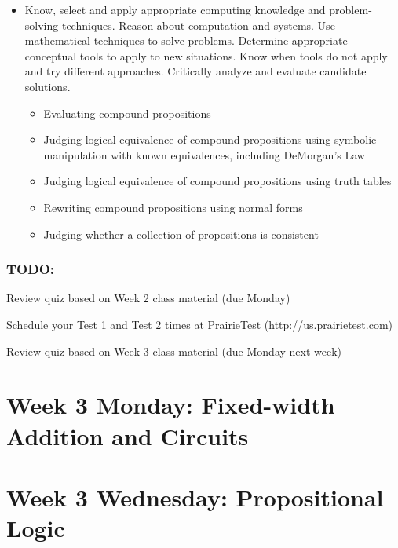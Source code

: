 \begin{itemize}
\item Know, select and apply appropriate computing knowledge and problem-solving techniques. Reason about computation and systems. Use mathematical techniques to solve problems. Determine appropriate conceptual tools to apply to new situations. Know when tools do not apply and try different approaches. Critically analyze and evaluate candidate solutions.
\begin{itemize}
    \item Evaluating compound propositions
    \item Judging logical equivalence of compound propositions using symbolic manipulation with known equivalences, including DeMorgan's Law
    \item Judging logical equivalence of compound propositions using truth tables
    \item Rewriting compound propositions using normal forms
    \item Judging whether a collection of propositions is consistent
\end{itemize}

\end{itemize}

\subsubsection*{TODO:}
\begin{list}
   {\itemsep2pt}
   \item Review quiz based on Week 2 class material (due Monday)
   \item Schedule your Test 1 and Test 2 times at PrairieTest (http://us.prairietest.com)
   \item Review quiz based on Week 3 class material (due Monday next week)
\end{list}

\newpage
\section*{Week 3 Monday: Fixed-width Addition and Circuits}

\newpage


\newpage
\section*{Week 3 Wednesday: Propositional Logic}


\vfill

\vfill
\newpage


\newpage
